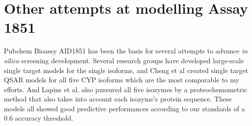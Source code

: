 



\section{Other attempts at modelling Assay 1851}
Pubchem Bioassy AID1851 has been the basis for several attempts to advance \textit{in silico} screening development. Several research groups have developed large-scale single target models for the single isoforms, \cite{Vasanthanathan2009, Sridhar2012, Sun2012, Novotarskyi2010} and Cheng et al created single target QSAR models for all five CYP isoforms which are the most comparable to my efforts. \cite{Cheng2011} And Lapins et al. also pursured all five isozymes by a proteochemometric method that also takes into account each isozyme's protein sequence. \cite{Lapins2013} These models all showed good predictive performances according to our standards of a 0.6 accuracy threshold.


